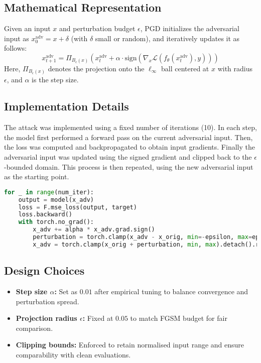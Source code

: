 \subsection*{Mathematical Representation}
Given an input $x$ and perturbation budget $\epsilon$, PGD initializes the adversarial input as $x_0^{\text{adv}} = x + \delta$ (with $\delta$ small or random), and iteratively updates it as follows:
\[
x_{t+1}^{\text{adv}} = \Pi_{B_\epsilon(x)} \left( x_t^{\text{adv}} + \alpha \cdot \text{sign}\left( \nabla_x \mathcal{L}(f_\theta(x_t^{\text{adv}}), y) \right) \right)
\]
Here, $\Pi_{B_\epsilon(x)}$ denotes the projection onto the $\ell_\infty$ ball centered at $x$ with radius $\epsilon$, and $\alpha$ is the step size.

\subsection*{Implementation Details}
The attack was implemented using a fixed number of iterations (10). In each step, the model first performed a forward pass on the current adversarial input. Then, 
the loss was computed and backpropagated to obtain input gradients. Finally the adversarial input was updated using the signed gradient and clipped back to the $\epsilon$-bounded domain. This process is then repeated, using the new adversarial input as the starting point.

\begin{lstlisting}[language=Python, caption={PGD Attack Loop (Simplified)}]
for _ in range(num_iter):
    output = model(x_adv)
    loss = F.mse_loss(output, target)
    loss.backward()
    with torch.no_grad():
        x_adv += alpha * x_adv.grad.sign()
        perturbation = torch.clamp(x_adv - x_orig, min=-epsilon, max=epsilon)
        x_adv = torch.clamp(x_orig + perturbation, min, max).detach().requires_grad_()
\end{lstlisting}

\subsection*{Design Choices}
\begin{itemize}
    \item \textbf{Step size $\alpha$:} Set as $0.01$ after empirical tuning to balance convergence and perturbation spread.
    \item \textbf{Projection radius $\epsilon$:} Fixed at $0.05$ to match FGSM budget for fair comparison.
    \item \textbf{Clipping bounds:} Enforced to retain normalised input range and ensure comparability with clean evaluations.
\end{itemize}


